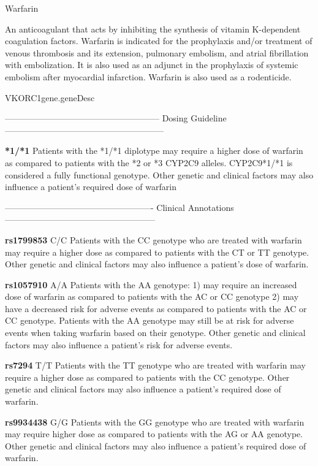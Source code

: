 \documentclass{resume} %
\begin{document}
\begin{rSection}{Warfarin}
\item An anticoagulant that acts by inhibiting the synthesis of vitamin K-dependent coagulation factors. Warfarin is indicated for the prophylaxis and/or treatment of venous thrombosis and its extension, pulmonary embolism, and atrial fibrillation with embolization. It is also used as an adjunct in the prophylaxis of systemic embolism after myocardial infarction. Warfarin is also used as a rodenticide.

\begin{rSubsection}{VKORC1}{gene.geneDesc}{}{}
\item[]------------------------------------------------------ Dosing Guideline --------------------------------------------------------
\item \textbf{*1/*1} \newline Patients with the *1/*1 diplotype may require a higher dose of warfarin as compared to patients with the *2 or *3 CYP2C9 alleles. CYP2C9*1/*1 is considered a fully functional genotype. Other genetic and clinical factors may also influence a patient's required dose of warfarin 
\item[] ---------------------------------------------------- Clinical Annotations -----------------------------------------------------
\item \textbf{rs1799853} C/C \newline Patients with the CC genotype who are treated with warfarin may require a higher dose as compared to patients with the CT or TT genotype. Other genetic and clinical factors may also influence a patient's dose of warfarin.
\item \textbf{rs1057910} A/A \newline Patients with the AA genotype: 1) may require an increased dose of warfarin as compared to patients with the AC or CC genotype 2) may have a decreased risk for adverse events as compared to patients with the AC or CC genotype. Patients with the AA genotype may still be at risk for adverse events when taking warfarin based on their genotype. Other genetic and clinical factors may also influence a patient's risk for adverse events.
\item \textbf{rs7294} T/T \newline Patients with the TT genotype who are treated with warfarin may require a higher dose as compared to patients with the CC genotype. Other genetic and clinical factors may also influence a patient's required dose of warfarin.
\item \textbf{rs9934438} G/G \newline Patients with the GG genotype who are treated with warfarin may require higher dose as compared to patients with the AG or AA genotype. Other genetic and clinical factors may also influence a patient's required dose of warfarin.
\end{rSubsection}

\end{rSection}
\end{document}
